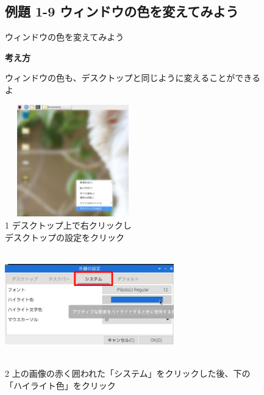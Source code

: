 \documentclass[a4paper,12pt]{jarticle}
\begin{document}
\bigskip

\clearpage

\begin{figure}
  \subsection{例題 1-9 ウィンドウの色を変えてみよう}
  ウィンドウの色を変えてみよう

  \textbf{考え方}


  \bigskip



  \centering
  \begin{minipage}{\textwidth}
    \begin{minipage}{7.737cm}
      ウィンドウの色も、デスクトップと同じように変えることができるよ
      \begin{minipage}{7.739cm}
        \includegraphics[width=5.892cm,height=4.864cm]{textbook-img107.png}\\
        1 デスクトップ上で右クリックし\\
        デスクトップの設定をクリック
      \end{minipage}
    \end{minipage}
    \begin{minipage}{2.582cm}
    \end{minipage}
    \begin{minipage}{7.737cm}
      \includegraphics[width=7.324cm,height=4.539cm]{textbook-img1001.png}\\
      \begin{minipage}{8.035cm}
        2 上の画像の赤く囲われた「システム」をクリックした後、下の「ハイライト色」をクリック
      \end{minipage}
    \end{minipage}


\end{minipage}
\end{figure}
\end{document}
